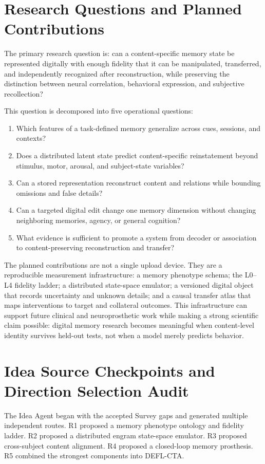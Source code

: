 \documentclass[conference]{IEEEtran}
\begin{document}
\section{Research Questions and Planned Contributions}
The primary research question is: can a content-specific memory state be represented digitally with enough fidelity that it can be manipulated, transferred, and independently recognized after reconstruction, while preserving the distinction between neural correlation, behavioral expression, and subjective recollection?

This question is decomposed into five operational questions:
\begin{enumerate}
\item Which features of a task-defined memory generalize across cues, sessions, and contexts?
\item Does a distributed latent state predict content-specific reinstatement beyond stimulus, motor, arousal, and subject-state variables?
\item Can a stored representation reconstruct content and relations while bounding omissions and false details?
\item Can a targeted digital edit change one memory dimension without changing neighboring memories, agency, or general cognition?
\item What evidence is sufficient to promote a system from decoder or association to content-preserving reconstruction and transfer?
\end{enumerate}

The planned contributions are not a single upload device. They are a reproducible measurement infrastructure: a memory phenotype schema; the L0--L4 fidelity ladder; a distributed state-space emulator; a versioned digital object that records uncertainty and unknown details; and a causal transfer atlas that maps interventions to target and collateral outcomes. This infrastructure can support future clinical and neuroprosthetic work while making a strong scientific claim possible: digital memory research becomes meaningful when content-level identity survives held-out tests, not when a model merely predicts behavior.

\section{Idea Source Checkpoints and Direction Selection Audit}
The Idea Agent began with the accepted Survey gaps and generated multiple independent routes. R1 proposed a memory phenotype ontology and fidelity ladder. R2 proposed a distributed engram state-space emulator. R3 proposed cross-subject content alignment. R4 proposed a closed-loop memory prosthesis. R5 combined the strongest components into DEFL-CTA.
\end{document}
